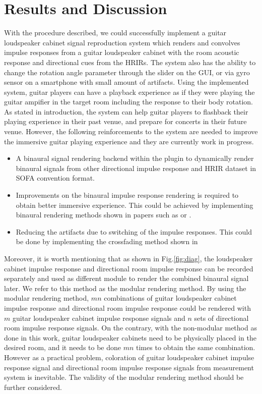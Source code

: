 \documentclass[convention,e-brief]{aesconf-current}
\begin{document}
\section{Results and Discussion}
With the procedure described, we could successfully implement a guitar loudspeaker cabinet signal reproduction system which renders and convolves impulse responses from a guitar loudspeaker cabinet with the room acoustic response and directional cues from the HRIRs.
The system also has the ability to change the rotation angle parameter through the slider on the GUI, or via gyro sensor on a smartphone with small amount of artifacts.
Using the implemented system, guitar players can have a playback experience as if they were playing the guitar ampifier in the target room including the response to their body rotation.
As stated in introduction, the system can help guitar players to flashback their playing experience in their past venue, and prepare for concerts in their future venue.
However, the following reinforcements to the system are needed to improve the immersive guitar playing experience and they are currently work in progress.

\begin{itemize}
    \item A binaural signal rendering backend within the plugin to dynamically render binaural signals from other directional impulse response and HRIR dataset in SOFA convention format\cite{AES69-2015}.
    \item Improvements on the binaural impulse response rendering is required to obtain better immersive experience.
          This could be achieved by implementing binaural rendering methods shown in papers such as \cite{Zaunschirm2018-mn} or \cite{Schorkhuber2018-ql}.
    \item Reducing the artifacts due to switching of the impulse responses. This could be done by implementing the crossfading method shown in \cite{phdthesis}
\end{itemize}

Moreover, it is worth mentioning that as shown in Fig.\ref{fig:diag}, the loudspeaker cabinet impulse response and directional room impulse response can be recorded separately and used as different module to render the combined binaural signal later.
We refer to this method as the modular rendering method.
By using the modular rendering method, $mn$ combinations of guitar loudspeaker cabinet impulse response and directional room impulse response could be rendered with $m$ guitar loudspeaker cabinet impulse response signals and $n$ sets of directional room impulse response signals.
On the contrary, with the non-modular method as done in this work, guitar loudspeaker cabinets need to be physically placed in the desired room, and it needs to be done $mn$ times to obtain the same combination.
However as a practical problem, coloration of guitar loudspeaker cabinet impulse response signal and directional room impulse response signals from measurement system is inevitable.
The validity of the modular rendering method should be further considered.
\end{document}

